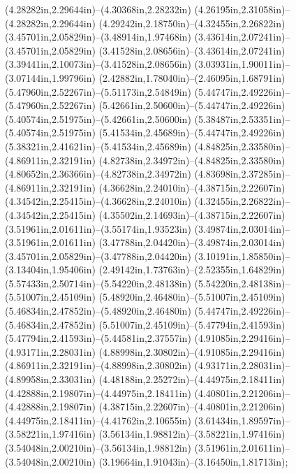 (4.28282in,2.29644in)--(4.30368in,2.28232in) (4.26195in,2.31058in)--(4.28282in,2.29644in) (4.29242in,2.18750in)--(4.32455in,2.26822in) (3.45701in,2.05829in)--(3.48914in,1.97468in) (3.43614in,2.07241in)--(3.45701in,2.05829in) (3.41528in,2.08656in)--(3.43614in,2.07241in) (3.39441in,2.10073in)--(3.41528in,2.08656in) (3.03931in,1.90011in)--(3.07144in,1.99796in) (2.42882in,1.78040in)--(2.46095in,1.68791in) (5.47960in,2.52267in)--(5.51173in,2.54849in) (5.44747in,2.49226in)--(5.47960in,2.52267in) (5.42661in,2.50600in)--(5.44747in,2.49226in) (5.40574in,2.51975in)--(5.42661in,2.50600in) (5.38487in,2.53351in)--(5.40574in,2.51975in) (5.41534in,2.45689in)--(5.44747in,2.49226in) (5.38321in,2.41621in)--(5.41534in,2.45689in) (4.84825in,2.33580in)--(4.86911in,2.32191in) (4.82738in,2.34972in)--(4.84825in,2.33580in) (4.80652in,2.36366in)--(4.82738in,2.34972in) (4.83698in,2.37285in)--(4.86911in,2.32191in) (4.36628in,2.24010in)--(4.38715in,2.22607in) (4.34542in,2.25415in)--(4.36628in,2.24010in) (4.32455in,2.26822in)--(4.34542in,2.25415in) (4.35502in,2.14693in)--(4.38715in,2.22607in) (3.51961in,2.01611in)--(3.55174in,1.93523in) (3.49874in,2.03014in)--(3.51961in,2.01611in) (3.47788in,2.04420in)--(3.49874in,2.03014in) (3.45701in,2.05829in)--(3.47788in,2.04420in) (3.10191in,1.85850in)--(3.13404in,1.95406in) (2.49142in,1.73763in)--(2.52355in,1.64829in) (5.57433in,2.50714in)--(5.54220in,2.48138in) (5.54220in,2.48138in)--(5.51007in,2.45109in) (5.48920in,2.46480in)--(5.51007in,2.45109in) (5.46834in,2.47852in)--(5.48920in,2.46480in) (5.44747in,2.49226in)--(5.46834in,2.47852in) (5.51007in,2.45109in)--(5.47794in,2.41593in) (5.47794in,2.41593in)--(5.44581in,2.37557in) (4.91085in,2.29416in)--(4.93171in,2.28031in) (4.88998in,2.30802in)--(4.91085in,2.29416in) (4.86911in,2.32191in)--(4.88998in,2.30802in) (4.93171in,2.28031in)--(4.89958in,2.33031in) (4.48188in,2.25272in)--(4.44975in,2.18411in) (4.42888in,2.19807in)--(4.44975in,2.18411in) (4.40801in,2.21206in)--(4.42888in,2.19807in) (4.38715in,2.22607in)--(4.40801in,2.21206in) (4.44975in,2.18411in)--(4.41762in,2.10655in) (3.61434in,1.89597in)--(3.58221in,1.97416in) (3.56134in,1.98812in)--(3.58221in,1.97416in) (3.54048in,2.00210in)--(3.56134in,1.98812in) (3.51961in,2.01611in)--(3.54048in,2.00210in) (3.19664in,1.91043in)--(3.16450in,1.81713in);
